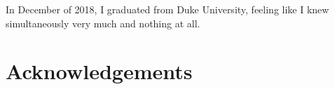 
In December of 2018, I graduated from Duke University, feeling like I knew simultaneously very much and nothing at all.



\newpage


\part*{Acknowledgements}

